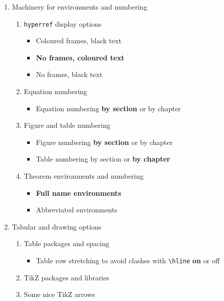 \begin{enumerate}[\bf 1]
\item Machinery for environments and numbering
\begin{enumerate}[3.1]
\item \verb|hyperref| display options
\begin{itemize}
\item Coloured frames, black text
\item \textbf{No frames, coloured text}
\item No frames, black text
\end{itemize}
\item Equation numbering
\begin{itemize}
\item Equation numbering \textbf{by section} or by chapter
\end{itemize}
\item Figure and table numbering
\begin{itemize}
\item Figure numbering \textbf{by section} or by chapter
\item Table numbering by section or \textbf{by chapter}
\end{itemize}
\item Theorem environments and numbering
\begin{itemize}
\item \textbf{Full name environments}
\item Abbreviated environments
\end{itemize}
\end{enumerate}

\item Tabular and drawing options
\begin{enumerate}[4.1]
\item Table packages and spacing
\begin{itemize}
\item Table row stretching to avoid clashes with \verb|\hline| \textbf{on} or off
\end{itemize}
\item TikZ packages and libraries
\item Some nice TikZ arrows
\end{enumerate}


\end{enumerate}
